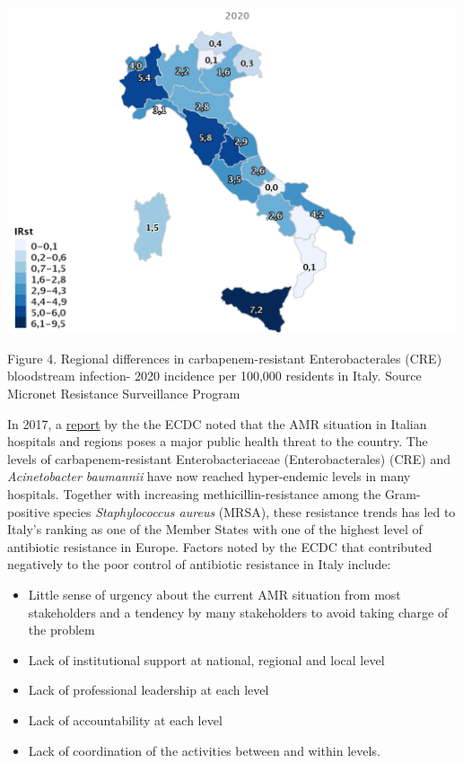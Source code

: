 \documentclass[]{tufte-handout}
\providecommand{\tightlist}{%
  \setlength{\itemsep}{0pt}\setlength{\parskip}{0pt}}
\begin{document}
\includegraphics[width=5.20833in,height=\textheight]{images/Italia_CRE.png}

Figure 4. Regional differences in carbapenem-resistant Enterobacterales
(CRE) bloodstream infection- 2020 incidence per 100,000 residents in
Italy. Source Micronet Resistance Surveillance Program

In 2017, a
\href{https://www.ecdc.europa.eu/en/publications-data/ecdc-country-visit-italy-discuss-antimicrobial-resistance-issues}{report}
by the the ECDC noted that the AMR situation in Italian hospitals and
regions poses a major public health threat to the country. The levels of
carbapenem-resistant Enterobacteriaceae (Enterobacterales) (CRE) and
\emph{Acinetobacter baumannii} have now reached hyper-endemic levels in
many hospitals. Together with increasing methicillin-resistance among
the Gram-positive species \emph{Staphylococcus aureus} (MRSA), these
resistance trends has led to Italy's ranking as one of the Member States
with one of the highest level of antibiotic resistance in Europe.
Factors noted by the ECDC that contributed negatively to the poor
control of antibiotic resistance in Italy include:

\begin{itemize}
\tightlist
\item
  Little sense of urgency about the current AMR situation from most
  stakeholders and a tendency by many stakeholders to avoid taking
  charge of the problem
\item
  Lack of institutional support at national, regional and local level
\item
  Lack of professional leadership at each level
\item
  Lack of accountability at each level
\item
  Lack of coordination of the activities between and within levels.
\end{itemize}
\end{document}

